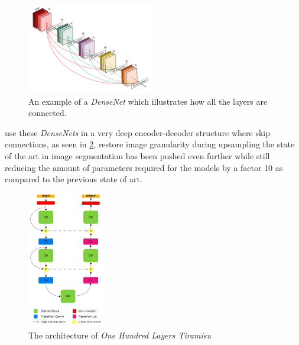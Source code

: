 \documentclass{kththesis}
\begin{document}
\begin{figure}[h]
  \centering
  \includegraphics[width=0.5\textwidth]{dense}
  \caption{An example of a \textit{DenseNet} which illustrates how all the
    layers are connected.}
  \label{fig:DenseNet}
  \end{figure}

\textcite{jegou2017one} use these \emph{DenseNets} in a very deep encoder-decoder
structure where skip connections, as seen in \cref{fig:Tiramisu}, restore image granularity during upsampling the
state of the art in image segmentation has been pushed even further while still reducing the amount of parameters required
for the models by a factor 10 as compared to the previous state of art. 

\begin{figure}[h]
  \centering
  \includegraphics[width=0.3\textwidth]{Tiramisu}
  \caption{The architecture of \textit{One Hundred Layers Tiramisu}}
  \label{fig:Tiramisu}
  \end{figure}
\end{document}
